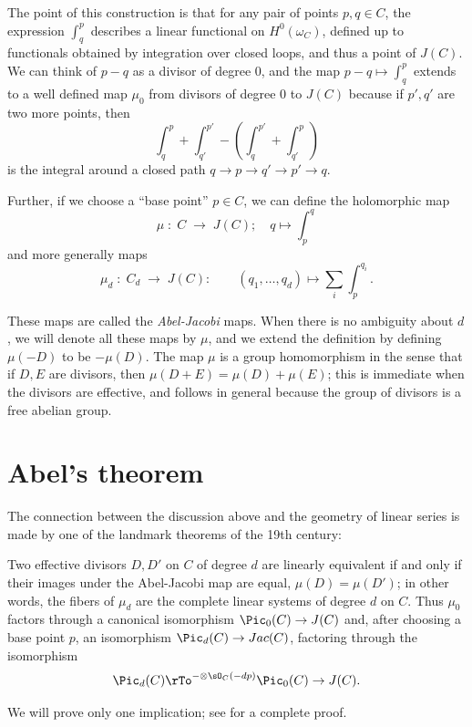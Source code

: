 The point of this construction is that for any pair of points $p, q \in C$, the expression $\int_q^p$ describes a linear functional on $H^0(\omega_C)$, defined up to functionals obtained by integration over closed loops, and thus a point of $J(C)$. We can think of $p-q$ as a divisor of
degree 0, and the map $p-q \mapsto \int_q^p$ extends to a well defined map $\mu_0$ from divisors of degree 0 to $J(C)$ because if $p',q'$ are two more points, then
$$
\int_q^p +\int_{q'}^{p'} - (\int_q^{p'} +\int_{q'}^p) 
$$
is the integral around a closed path $q\to p\to q'\to p' \to q$.

Further, if we choose a ``base point''  $p\in C$, we can define the holomorphic map
$$
\mu \; : \; C \; \to \; J(C); \quad q\mapsto \int_{p}^{q}
$$
and more generally maps
$$
\mu_d \; : \; C_d \; \to \; J(C): \quad  \quad (q_1,\dots, q_d) \mapsto \sum_i \int_{p}^{q_i}.
$$

These maps are called the \emph{Abel-Jacobi} maps. When there is no ambiguity about $d$, we will denote all these maps  by $\mu$,  and  
we extend the definition by defining $\mu(-D)$ to be $-\mu(D)$.
The map $\mu$ is a group homomorphism in the sense that if $D, E$ are divisors, then
$\mu (D+E) = \mu(D) + \mu(E)$; this is immediate when the divisors are effective, and 
follows in general because the group of divisors is a free abelian group.

\section{Abel's theorem}

 The connection between the discussion above and the geometry of linear series is made by one of the landmark theorems of the 19th century:

\begin{theorem}\label{abel}
Two effective divisors $D, D'$ on $C$ of degree $d$ are linearly equivalent if and only if their images under the Abel-Jacobi map are equal, $\mu(D) = \mu(D')$; in other words, the fibers of $\mu_d$ are the complete linear systems of degree $d$ on $C$. Thus $\mu_0$ factors through a canonical isomorphism
$\Pic_0(C) \to J(C)$ and, after choosing a base point $p$, an isomorphism $\Pic_d(C) \to Jac(C)$, factoring through the isomorphism
$$
\Pic_d(C) \rTo^{-\otimes \sO_C(-dp)} \Pic_0(C) \to J(C).
$$
\end{theorem}

We will prove only one implication; see \cite[Section 2.2]{Griffiths-Harris1978}  for a complete proof.

